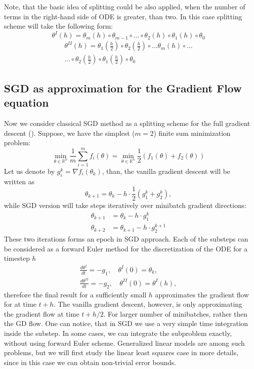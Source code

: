 \documentclass{article}
\begin{document}
Note, that the basic idea of splitting could be also applied, when the number of terms in the right-hand side of ODE is greater, than two. In this case splitting scheme will take the following form:
\begin{equation}\label{strang:marchuk}
	\theta^I(h) = \theta_m(h) \circ \theta_{m-1} \circ \ldots \circ \theta_2(h) \circ \theta_1(h) \circ \theta_0
\end{equation}
\begin{equation}\label{strang:strang}
\begin{split}
	\theta^{II}(h) = \theta_1\left(\frac{h}{2}\right) \circ \theta_2\left(\frac{h}{2}\right) \circ\ldots \theta_m(h) \circ \ldots \\ \ldots \circ \theta_2\left(\frac{h}{2}\right)  \circ \theta_1\left(\frac{h}{2}\right) \circ \theta_0
\end{split}
\end{equation}

\subsection{SGD as approximation for the Gradient Flow equation}
Now we consider classical SGD method as a splitting scheme for the full gradient descent (\cite{cauchy1847methode}). Suppose, we have the simplest ($m=2$) finite sum minimization problem:
$$
\min_{\theta \in \mathbb{R}^n} \frac{1}{m}\sum\limits_{i=1}^m f_i(\theta) = \min_{\theta \in \mathbb{R}^n} \frac{1}{2} \left( f_1(\theta) + f_2(\theta)\right)
$$
Let us denote by $g_i^k = \nabla f_i(\theta_k)$, than, the vanilla gradient descent will be written as
$$
\theta_{k+1} = \theta_k - h\cdot\frac{1}{2} \left( g^k_1 + g^k_2\right),
$$
while SGD version will take steps iteratively over minibatch gradient directions:
\begin{align*}\label{strang:sgd2}
\theta_{k+1} &= \theta_k - h\cdot g^k_1 \\
\theta_{k+2} &= \theta_{k+1} - h\cdot  g^{k+1}_2
\end{align*}
These two iterations forms an epoch in SGD approach. Each of the substeps can be considered as a forward Euler method for the discretization of the ODE for a timestep $h$
\begin{align*}
    \frac{d \theta^I}{d t} = -g_1, \quad \theta^I(0) = \theta_{k},\\
    \frac{d \theta^{II}}{d t} = -g_2, \quad \theta^{II}(0) = \theta^{I}(h),
\end{align*}
therefore the final result for a sufficiently small $h$ approximates the gradient flow for at time $t + h$. The vanilla gradient descent, however, is only approximating the gradient flow at time $t + h/2$. For larger number of minibatches, rather then the GD flow. One can notice, that in SGD we use a very simple time integration inside the substep. In some cases, we can integrate the subproblem exactly, without using forward Euler scheme. Generalized linear models are among such problems, but we will first study the linear least squares case in more details, since in this case we can obtain non-trivial error bounds.
\end{document}
